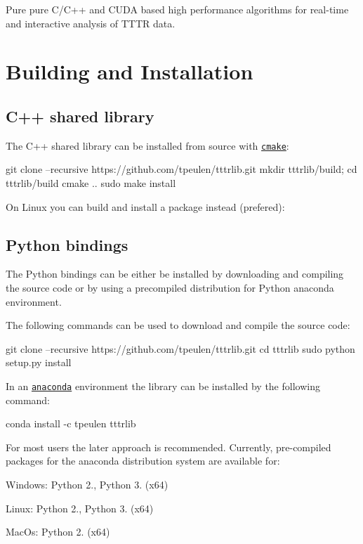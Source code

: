 Pure pure C/\+C++ and C\+U\+DA based high performance algorithms for real-\/time and interactive analysis of T\+T\+TR data.

\section*{Building and Installation}

\subsection*{C++ shared library}

The C++ shared library can be installed from source with \href{https://cmake.org/}{\tt cmake}\+:


\begin{DoxyCode}
git clone --recursive https://github.com/tpeulen/tttrlib.git
mkdir tttrlib/build; cd tttrlib/build
cmake ..
sudo make install
\end{DoxyCode}


On Linux you can build and install a package instead (prefered)\+:

\subsection*{Python bindings}

The Python bindings can be either be installed by downloading and compiling the source code or by using a precompiled distribution for Python anaconda environment.

The following commands can be used to download and compile the source code\+:


\begin{DoxyCode}
git clone --recursive https://github.com/tpeulen/tttrlib.git
cd tttrlib
sudo python setup.py install
\end{DoxyCode}


In an \href{https://www.anaconda.com/}{\tt anaconda} environment the library can be installed by the following command\+: 
\begin{DoxyCode}
conda install -c tpeulen tttrlib
\end{DoxyCode}


For most users the later approach is recommended. Currently, pre-\/compiled packages for the anaconda distribution system are available for\+:


\begin{DoxyItemize}
\item Windows\+: Python 2., Python 3. (x64)
\item Linux\+: Python 2., Python 3. (x64)
\item Mac\+Os\+: Python 2. (x64)
\end{DoxyItemize}

